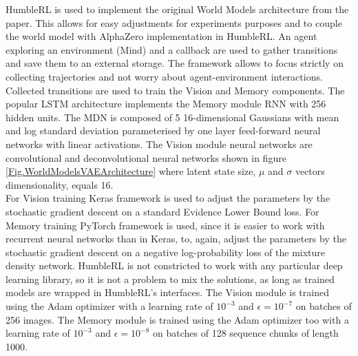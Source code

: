 HumbleRL is used to implement the original World Models architecture from the paper. This allows for easy adjustments for experiments purposes and to couple the world model with AlphaZero implementation in HumbleRL. An agent exploring an environment (Mind) and a callback are used to gather transitions and save them to an external storage. The framework allows to focus strictly on collecting trajectories and not worry about agent-environment interactions. \\
Collected transitions are used to train the Vision and Memory components. The popular LSTM architecture \cite{Algo.LSTM} implements the Memory module RNN with 256 hidden units. The MDN is composed of 5 16-dimensional Gaussians with mean and log standard deviation parameterised by one layer feed-forward neural networks with linear activations. The Vision module neural networks are convolutional and deconvolutional neural networks shown in figure \ref{Fig.WorldModelsVAEArchitecture} where latent state size, $\mu$ and $\sigma$ vectors dimensionality, equals 16. \\
For Vision training Keras \cite{Code.Keras} framework is used to adjust the parameters by the stochastic gradient descent on a standard Evidence Lower Bound loss. For Memory training PyTorch \cite{Code.PyTorch} framework is used, since it is easier to work with recurrent neural networks than in Keras, to, again, adjust the parameters by the stochastic gradient descent on a negative log-probability loss of the mixture density network. HumbleRL is not constricted to work with any particular deep learning library, so it is not a problem to mix the solutions, as long as trained models are wrapped in HumbleRL's interfaces.
The Vision module is trained using the Adam optimizer \cite{Algo.Adam} with a learning rate of $10^{-3}$ and $\epsilon = 10^{−7}$ on batches of 256 images. The Memory module is trained using the Adam optimizer \cite{Algo.Adam} too with a learning rate of $10^{-3}$ and $\epsilon = 10^{−8}$ on batches of 128 sequence chunks of length 1000. \\

